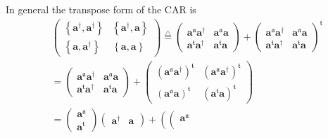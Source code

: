 \documentclass[aps, preprint]{revtex4}
\begin{document}
In general the transpose form of the CAR is
\begin{align} & \left (\begin{array}{cc}\left \{\mathbf{a}^{ \dag } ,\mathbf{a}^{ \dag }\right \} & \left \{\mathbf{a}^{ \dag } ,\mathbf{a}\right \} \\
\left \{\mathbf{a} ,\mathbf{a}^{ \dag }\right \} & \left \{\mathbf{a} ,\mathbf{a}\right \}\end{array}\right )\overset{\triangle }{ =}\left (\begin{array}{cc}\mathbf{a}^{\mathfrak{a}} \mathbf{a}^{ \dag } & \mathbf{a}^{\mathfrak{a}} \mathbf{a} \\
\mathbf{a}^{\mathfrak{t}} \mathbf{a}^{ \dag } & \mathbf{a}^{\mathfrak{t}} \mathbf{a}\end{array}\right ) +\left (\begin{array}{cc}\mathbf{a}^{\mathfrak{a}} \mathbf{a}^{ \dag } & \mathbf{a}^{\mathfrak{a}} \mathbf{a} \\
\mathbf{a}^{\mathfrak{t}} \mathbf{a}^{ \dag } & \mathbf{a}^{\mathfrak{t}} \mathbf{a}\end{array}\right )^{\mathfrak{t}} \nonumber  \\
 &  =\left (\begin{array}{cc}\mathbf{a}^{\mathfrak{a}} \mathbf{a}^{ \dag } & \mathbf{a}^{\mathfrak{a}} \mathbf{a} \\
\mathbf{a}^{\mathfrak{t}} \mathbf{a}^{ \dag } & \mathbf{a}^{\mathfrak{t}} \mathbf{a}\end{array}\right ) +\left (\begin{array}{cc}\left (\mathbf{a}^{\mathfrak{a}} \mathbf{a}^{ \dag }\right )^{\mathfrak{t}} & \left (\mathbf{a}^{\mathfrak{a}} \mathbf{a}^{ \dag }\right )^{\mathfrak{t}} \\
\left (\mathbf{a}^{\mathfrak{a}} \mathbf{a}\right )^{\mathfrak{t}} & \left (\mathbf{a}^{\mathfrak{t}} \mathbf{a}\right )^{\mathfrak{t}}\end{array}\right ) \nonumber  \\
 &  =\left (\begin{array}{c}\mathbf{a}^{\mathfrak{a}} \\
\mathbf{a}^{\mathfrak{t}}\end{array}\right ) \left (\begin{array}{cc}\mathbf{a}^{ \dag } & \mathbf{a}\end{array}\right ) +\left (\left (\begin{array}{c}\mathbf{a}^{\mathfrak{a}} \\

\end{array}
\end{align}
\end{document}
